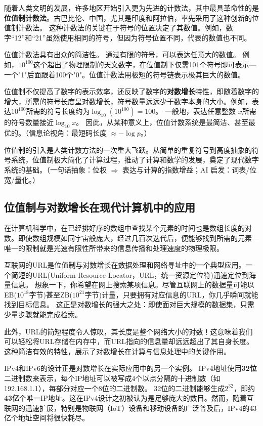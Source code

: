 随着人类文明的发展，许多地区开始引入更为先进的计数法，其中最具革命性的是{\bf 位值制计数法}。古巴比伦、中国，尤其是印度和阿拉伯，率先采用了这种创新的位值制计数法。
这种计数法的关键在于符号的位置决定了其数值。例如，数字“12”和“21”虽然使用相同的符号，但因为符号位置不同，代表的数值也不同。

位值计数法具有出众的简洁性。
通过有限的符号，可以表达任意大的数值。
例如，$10^{100}$这个超出了物理限制的天文数字，在位值制下仅需101个符号即可表示---一个"1"后面跟着100个"0"。位值计数法用极短的符号链表示极其巨大的数值。

位值制不仅提高了数字的表示效率，还反映了数字的{\bf 对数增长}特性，即随着数字的增大，所需的符号长度呈对数增长，符号数量远远少于数字本身的大小。例如，表达$10^{100}$所需的符号长度约为$\log_{10}(10^{100})=100$。
一般地，表达任意整数 $x$所需的符号数量接近${\log_{10} x}$。
因此，从某种意义上，位值计数系统是最简洁、甚至最优的。{（信息论视角：最短码长度 $\approx -\log p$。）}

位值制的引入是人类计数方法的一次重大飞跃。从简单的重复符号到高度抽象的符号系统，位值制极大简化了计算过程，推动了计算和数学的发展，奠定了现代数字系统的基础。{（一句话抽象：位权 $\Rightarrow$ 表达与计算的指数增益；AI 启发：词表/位宽/量化。）}

\subsection{位值制与对数增长在现代计算机中的应用}
在计算机科学中，在已经排好序的数组中查找某个元素的时间也是数组长度的对数。即使数组规模如同宇宙般庞大，经过几百次迭代后，便能够找到所需的元素---唯一的限制就是光速有限性所带来的信息传播和处理速度的物理极限。

互联网的URL是位值制与对数增长在数据处理和网络寻址中的一个典型应用。一个简短的URL(Uniform Resource Locator，URL，统一资源定位符)迅速定位到海量信息。
想象一下，你希望在网上搜索某项信息。尽管互联网上的数据量可能以EB($10^{18}$字节)甚至ZB($10^{21}$字节)计量，只要拥有对应信息的URL，你几乎瞬间就能找到目标信息。
这正是对数增长的强大之处：即使面对巨大规模的数据集，只需少量步骤就能完成检索。

此外，URL的简短程度令人惊叹，其长度是整个网络大小的对数！这意味着我们可以轻松将URL存储在内存中，而URL指向的信息量却远远超出了其自身长度。
这种简洁有效的特性，展示了对数增长在计算与信息处理中的关键作用。

IPv4和IPv6的设计正是对数增长在实际应用中的另一个实例。
 IPv4地址使用{\bf 32位}二进制数来表示，每个IP地址可以被写成4个以点分隔的十进制数（如192.168.1.1），每部分对应一个8位的二进制数。
32位的二进制能够生成$2^{32}$，即约{\bf 43亿}个唯一IP地址。这在IPv4设计之初被认为是足够庞大的数目。然而，随着互联网的迅速扩展，特别是物联网（IoT）设备和移动设备的广泛普及后，IPv4的43亿个地址空间将很快耗尽。

